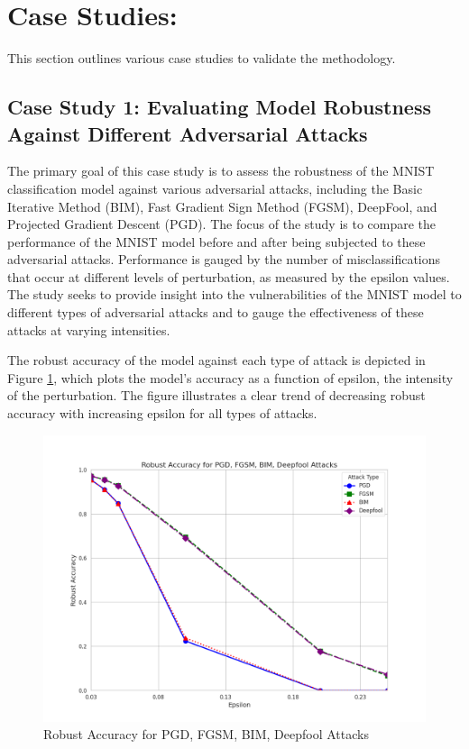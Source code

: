 \documentclass[10pt, conference, a4paper, final]{IEEEtran}
\begin{document}
\section{Case Studies:}

This section outlines various case studies to validate the methodology.

\subsection{Case Study 1: Evaluating Model Robustness Against Different Adversarial Attacks}
The primary goal of this case study is to assess the robustness of the MNIST classification model against various adversarial attacks, including the Basic Iterative Method (BIM), Fast Gradient Sign Method (FGSM), DeepFool, and Projected Gradient Descent (PGD). The focus of the study is to compare the performance of the MNIST model before and after being subjected to these adversarial attacks. Performance is gauged by the number of misclassifications that occur at different levels of perturbation, as measured by the epsilon values. The study seeks to provide insight into the vulnerabilities of the MNIST model to different types of adversarial attacks and to gauge the effectiveness of these attacks at varying intensities.

The robust accuracy of the model against each type of attack is depicted in Figure \ref{fig:robust_accuracy_attacks}, which plots the model's accuracy as a function of epsilon, the intensity of the perturbation. The figure illustrates a clear trend of decreasing robust accuracy with increasing epsilon for all types of attacks.

\begin{figure}[ht]
    \centering
    \includegraphics[width=\linewidth]{robust.png}
    \caption{Robust Accuracy for PGD, FGSM, BIM, Deepfool Attacks}
    \label{fig:robust_accuracy_attacks}
\end{figure}
\end{document}
